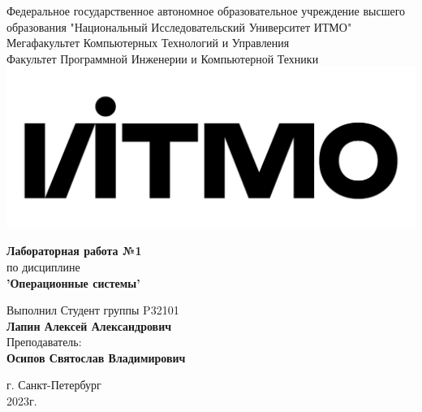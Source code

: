 \documentclass[12pt,onecolumn]{article}
\begin{document}
\setcounter{tocdepth}{4}
\begin{center}
    Федеральное государственное автономное образовательное учреждение высшего образования "Национальный Исследовательский Университет ИТМО"\\ 
    Мегафакультет Компьютерных Технологий и Управления\\
    Факультет Программной Инженерии и Компьютерной Техники \\
    \includegraphics[scale=0.3]{image/itmo.jpg} %
\end{center}
\vspace{1cm}


\begin{center}
    \textbf{Лабораторная работа №1}\\
    по дисциплине\\
    \textbf{'Операционные системы'}\\
\end{center}

\vspace{2cm}

\begin{flushright}
  Выполнил Студент  группы P32101\\
  \textbf{Лапин Алексей Александрович}\\
  Преподаватель: \\
  \textbf{Осипов Святослав Владимирович}\\
\end{flushright}

\vspace{6cm}
\begin{center}
    г. Санкт-Петербург\\
    2023г.
\end{center}

\newpage
\tableofcontents
\newpage
\end{document}
